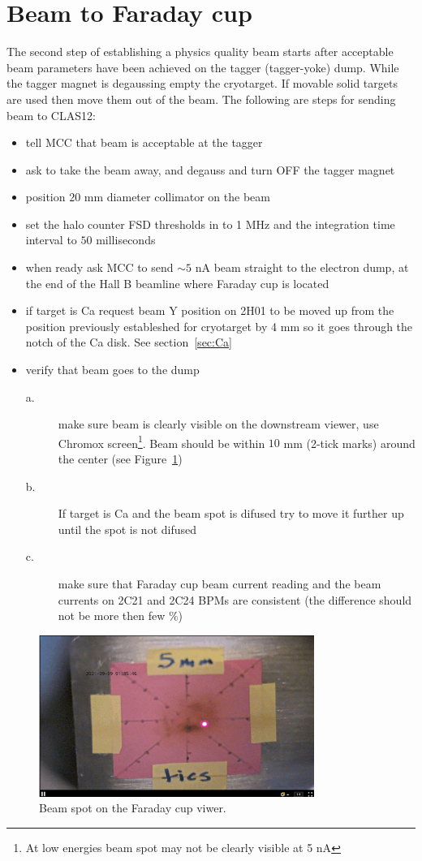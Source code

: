 \clearpage
\section{Beam to Faraday cup}
\indent

The second step of establishing a physics quality beam starts after acceptable beam parameters have been achieved on the tagger (tagger-yoke) dump. While the tagger magnet is degaussing empty the cryotarget. If movable solid targets are used then move them out of the beam. 
The following are steps for sending beam to CLAS12:
\begin{itemize}
\item tell MCC that beam is acceptable at the tagger
\item ask to take the beam away, and degauss and turn OFF the tagger magnet 
\item position $20$ mm diameter collimator on the beam 
\item set the halo counter FSD thresholds in to 1 MHz and the integration time interval to $50$ milliseconds
\item when ready ask MCC to send $\sim 5$ nA beam straight to the electron dump, at the end of the Hall B beamline where Faraday cup is located 
\item if target is Ca request beam Y position on 2H01 to be moved up from the position previously estableshed for cryotarget by 4 mm so it goes through the notch of the Ca disk. See section~\ref{sec:Ca}
\item verify that beam goes to the dump 
\begin{description}
\item[a.] make sure beam is clearly visible on the downstream viewer, use Chromox screen\footnote{At low energies beam spot may not be clearly visible at 5 nA}. Beam should be within $10$ mm (2-tick marks) around the center (see Figure~\ref{fig:FC_spot})
\item[b.] If target is Ca and the beam spot is difused try to move it further up until the spot is not difused
\item[c.] make sure that Faraday cup beam current reading and the beam currents on 2C21 and 2C24 BPMs are consistent (the difference  should not be more then few \%)
\end{description}
\end{itemize}
\begin{figure}[htb!]
\centering
\includegraphics[width=0.8\textwidth]{FC_viewer.pdf}
\caption{Beam spot on the Faraday cup viwer.}
\label{fig:FC_spot}
\end{figure}

